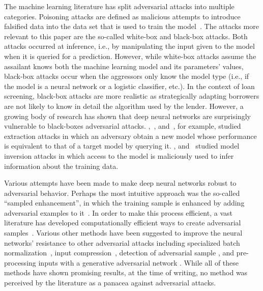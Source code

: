 \documentclass[12pt]{article} %
\begin{document}
The machine learning literature has split adversarial attacks into multiple categories. Poisoning attacks are defined as malicious attempts to introduce falsified data into the data set that is used to train the model~\citep[see, e.g.,][]{yang2017generative,jagielski2018manipulating}. The attacks more relevant to this paper are the so-called white-box and black-box attacks. Both attacks occurred at inference, i.e., by manipulating the input given to the model when it is queried for a prediction. However, while white-box attacks assume the assailant knows both the machine learning model and its parameters' values, black-box attacks occur when the aggressors only know the model type (i.e., if the model is a neural network or a logistic classifier, etc.). In the context of loan screening, black-box attacks are more realistic as strategically adapting borrowers are not likely to know in detail the algorithm used by the lender. However, a growing body of research has shown that deep neural networks are surprisingly vulnerable to black-boxes adversarial attacks. \cite{tramer2016stealing},~\cite{juuti2019prada}, and~\cite{takemura2020model}, for example, studied extraction attacks in which an adversary obtain a new model whose performance is equivalent to that of a target model by querying it. \cite{fredrikson2015model}, and~\cite{zhang2019secret} studied model inversion attacks in which access to the model is maliciously used to infer information about the training data. 

Various attempts have been made to make deep neural networks robust to adversarial behavior. Perhaps the most intuitive approach was the so-called ``sampled enhancement'', in which the training sample is enhanced by adding adversarial examples to it~\citep[see, e.g.,][]{huang2015learning,tramer2017ensemble, hosseini2017blocking}. In order to make this process efficient, a vast literature has developed computationally efficient ways to create adversarial samples~\citep[see, e.g.,][]{moosavi2016deepfool,kurakin2016adversarial,papernot2016limitations,cisse2017houdini,su2019one}. Various other methods have been suggested to improve the neural networks' resistance to other adversarial attacks including specialized batch normalization~\citep{rozsa2016towards}, input compression~\citep[see, e.g.,][]{dziugaite2016study,gao2017deepcloak}, detection of adversarial sample \citep{xu2017feature}, and pre-processing inputs with a generative adversarial network \citep{kurakin2018adversarial}. While all of these methods have shown promising results, at the time of writing, no method was perceived by the literature as a panacea against adversarial attacks. 
\end{document}
